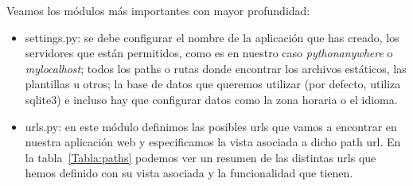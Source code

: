 \documentclass[a4paper, 12pt]{book}
\begin{document}
\begin{enumerate} [a)]
    Veamos los módulos más importantes con mayor profundidad:
    \begin{itemize}
        \item settings.py: se debe configurar el nombre de la aplicación que has creado, los servidores que están permitidos, como es en nuestro caso \textit{pythonanywhere} o \textit{mylocalhost}; todos los paths o rutas donde encontrar los archivos estáticos, las plantillas u otros; la base de datos que queremos utilizar (por defecto, utiliza sqlite3) e incluso hay que configurar datos como la zona horaria o el idioma.
        \item urls.py: en este módulo definimos las posibles urls que vamos a encontrar en nuestra aplicación web y especificamos la vista asociada a dicho path url. En la tabla~\ref{Tabla:paths} podemos ver un resumen de las distintas urls que hemos definido con su vista asociada y la funcionalidad que tienen.
        

\end{itemize}
\end{enumerate}
\end{document}
